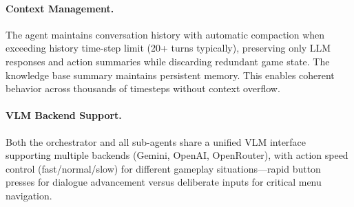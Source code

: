 \paragraph{Context Management.} The agent maintains conversation history with automatic compaction when exceeding history time-step limit (20+ turns typically), preserving only LLM responses and action summaries while discarding redundant game state. The knowledge base summary maintains persistent memory. This enables coherent behavior across thousands of timesteps without context overflow.

\paragraph{VLM Backend Support.} Both the orchestrator and all sub-agents share a unified VLM interface supporting multiple backends (Gemini, OpenAI, OpenRouter), with action speed control (fast/normal/slow) for different gameplay situations---rapid button presses for dialogue advancement versus deliberate inputs for critical menu navigation.
